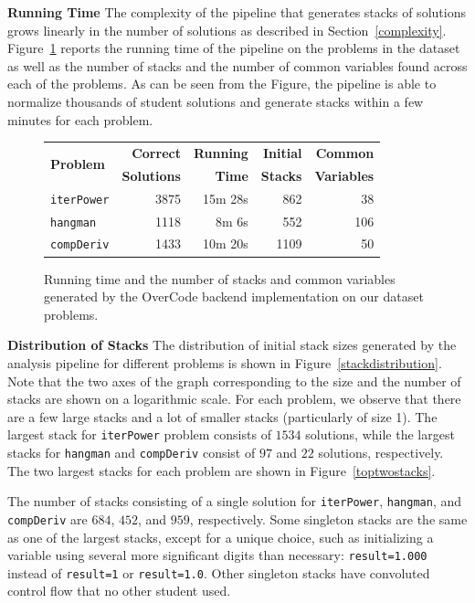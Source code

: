 \documentclass[12pt,twoside]{mitthesis}
\newcommand \codevar[1]{\texttt{#1}}
\begin{document}
{\bf Running Time} The complexity of the pipeline that generates stacks of solutions grows linearly in the number of solutions as described in Section~\ref{complexity}. Figure~\ref{backendevaluation} reports the running time of the pipeline on the problems in the dataset as well as the number of stacks and the number of common variables found across each of the problems. As can be seen from the Figure, the pipeline is able to normalize thousands of student solutions and generate stacks within a few minutes for each problem.

\begin{figure}[htpb]
\centering
\begin{tabular}{|l|r|r|r|r|}
\hline
\multirow{2}{*}{\bf Problem} & {\bf Correct} & {\bf Running} & {\bf Initial} & {\bf Common }\\
& {\bf Solutions} & {\bf Time } & {\bf Stacks} & {\bf Variables}\\
\hline\hline
\codevar{iterPower} & 3875 & 15m 28s & 862 & 38\\ \hline
\codevar{hangman} & 1118 & 8m 6s & 552 & 106\\ \hline
\codevar{compDeriv} & 1433 & 10m 20s & 1109 & 50\\ \hline
\end{tabular}
\caption{Running time and the number of stacks and common variables generated by the OverCode backend implementation on our dataset problems.}
\label{backendevaluation}
\end{figure}

{\bf Distribution of Stacks} The distribution of initial stack sizes generated by the analysis pipeline for different problems is shown in Figure~\ref{stackdistribution}. Note that the two axes of the graph corresponding to the size and the number of stacks are shown on a logarithmic scale. For each problem, we observe that there are a few large stacks and a lot of smaller stacks (particularly of size 1). The largest stack for \codevar{iterPower} problem consists of $1534$ solutions, while the largest stacks for \codevar{hangman} and \codevar{compDeriv} consist of $97$ and $22$ solutions, respectively. The two largest stacks for each problem are shown in Figure~\ref{toptwostacks}. 

The number of stacks consisting of a single solution for \codevar{iterPower}, \codevar{hangman}, and \codevar{compDeriv} are $684$, $452$, and $959$, respectively. Some singleton stacks are the same as one of the largest stacks, except for a unique choice, such as initializing a variable using several more significant digits than necessary: \codevar{result=1.000} instead of \codevar{result=1} or \codevar{result=1.0}. Other singleton stacks have convoluted control flow that no other student used. 
\end{document}
